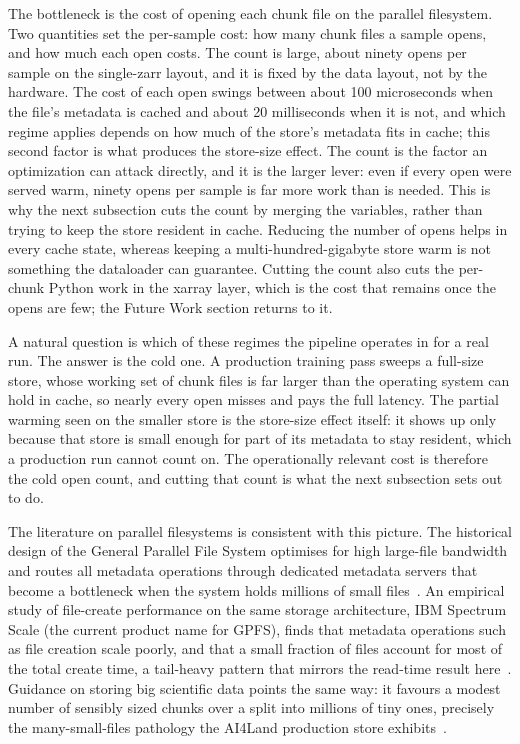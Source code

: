 \documentclass[12pt,a4paper]{article}
\begin{document}
The bottleneck is the cost of opening each chunk file on the parallel filesystem. Two
quantities set the per-sample cost: how many chunk files a sample opens, and how much each
open costs. The count is large, about ninety opens per sample on the single-zarr layout, and
it is fixed by the data layout, not by the hardware. The cost of each open swings between
about 100 microseconds when the file's metadata is cached and about 20 milliseconds when it
is not, and which regime applies depends on how much of the store's metadata fits in cache;
this second factor is what produces the store-size effect. The count is the factor an
optimization can attack directly, and it is the larger lever: even if every open were served
warm, ninety opens per sample is far more work than is needed. This is why the next
subsection cuts the count by merging the variables, rather than trying to keep the store
resident in cache. Reducing the number of opens helps in every cache state, whereas keeping a
multi-hundred-gigabyte store warm is not something the dataloader can guarantee. Cutting the
count also cuts the per-chunk Python work in the xarray layer, which is the cost that remains
once the opens are few; the Future Work section returns to it.

A natural question is which of these regimes the pipeline operates in for a real run. The
answer is the cold one. A production training pass sweeps a full-size store, whose working set
of chunk files is far larger than the operating system can hold in cache, so nearly every open
misses and pays the full latency. The partial warming seen on the smaller store is the
store-size effect itself: it shows up only because that store is small enough for part of its
metadata to stay resident, which a production run cannot count on. The operationally relevant
cost is therefore the cold open count, and cutting that count is what the next subsection sets
out to do.

The literature on parallel filesystems is consistent with this picture. The historical design
of the General Parallel File System optimises for high large-file bandwidth and routes all
metadata operations through dedicated metadata servers that become a bottleneck when the
system holds millions of small files~\cite{weka_gpfs}. An empirical study of file-create
performance on the same storage architecture, IBM Spectrum Scale (the current product name for
GPFS), finds that metadata operations such as file creation scale poorly, and that a small
fraction of files account for most of the total create time, a tail-heavy pattern that mirrors
the read-time result here~\cite{vef2016gpfs}. Guidance on storing big scientific data points the same way: it favours a modest number of
sensibly sized chunks over a split into millions of tiny ones, precisely the many-small-files
pathology the AI4Land production store exhibits~\cite{abernathey2021,dask_chunks}.
\end{document}
